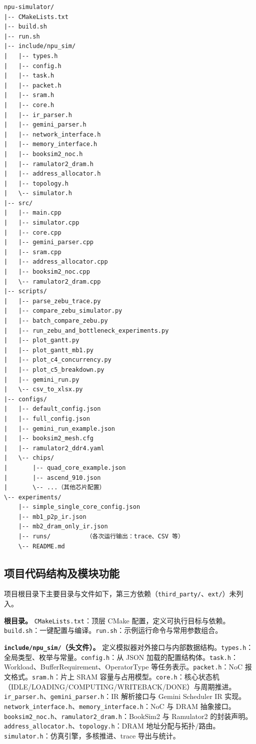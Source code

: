 {\small
\begin{verbatim}
npu-simulator/
|-- CMakeLists.txt
|-- build.sh
|-- run.sh
|-- include/npu_sim/
|   |-- types.h
|   |-- config.h
|   |-- task.h
|   |-- packet.h
|   |-- sram.h
|   |-- core.h
|   |-- ir_parser.h
|   |-- gemini_parser.h
|   |-- network_interface.h
|   |-- memory_interface.h
|   |-- booksim2_noc.h
|   |-- ramulator2_dram.h
|   |-- address_allocator.h
|   |-- topology.h
|   \-- simulator.h
|-- src/
|   |-- main.cpp
|   |-- simulator.cpp
|   |-- core.cpp
|   |-- gemini_parser.cpp
|   |-- sram.cpp
|   |-- address_allocator.cpp
|   |-- booksim2_noc.cpp
|   \-- ramulator2_dram.cpp
|-- scripts/
|   |-- parse_zebu_trace.py
|   |-- compare_zebu_simulator.py
|   |-- batch_compare_zebu.py
|   |-- run_zebu_and_bottleneck_experiments.py
|   |-- plot_gantt.py
|   |-- plot_gantt_mb1.py
|   |-- plot_c4_concurrency.py
|   |-- plot_c5_breakdown.py
|   |-- gemini_run.py
|   \-- csv_to_xlsx.py
|-- configs/
|   |-- default_config.json
|   |-- full_config.json
|   |-- gemini_run_example.json
|   |-- booksim2_mesh.cfg
|   |-- ramulator2_ddr4.yaml
|   \-- chips/
|       |-- quad_core_example.json
|       |-- ascend_910.json
|       \-- ...（其他芯片配置）
\-- experiments/
    |-- simple_single_core_config.json
    |-- mb1_p2p_ir.json
    |-- mb2_dram_only_ir.json
    |-- runs/          （各次运行输出：trace、CSV 等）
    \-- README.md
\end{verbatim}
}

\subsection{项目代码结构及模块功能}

项目根目录下主要目录与文件如下，第三方依赖（\texttt{third\_party/}、\texttt{ext/}）未列入。

\textbf{根目录。}
\texttt{CMakeLists.txt}：顶层 CMake 配置，定义可执行目标与依赖。\texttt{build.sh}：一键配置与编译。\texttt{run.sh}：示例运行命令与常用参数组合。

\textbf{\texttt{include/npu\_sim/}（头文件）。}
定义模拟器对外接口与内部数据结构。\texttt{types.h}：全局类型、枚举与常量。\texttt{config.h}：从 JSON 加载的配置结构体。\texttt{task.h}：Workload、BufferRequirement、OperatorType 等任务表示。\texttt{packet.h}：NoC 报文格式。\texttt{sram.h}：片上 SRAM 容量与占用模型。\texttt{core.h}：核心状态机（IDLE/LOADING/COMPUTING/WRITEBACK/DONE）与周期推进。\texttt{ir\_parser.h}、\texttt{gemini\_parser.h}：IR 解析接口与 Gemini Scheduler IR 实现。\texttt{network\_interface.h}、\texttt{memory\_interface.h}：NoC 与 DRAM 抽象接口。\texttt{booksim2\_noc.h}、\texttt{ramulator2\_dram.h}：BookSim2 与 Ramulator2 的封装声明。\texttt{address\_allocator.h}、\texttt{topology.h}：DRAM 地址分配与拓扑/路由。\texttt{simulator.h}：仿真引擎，多核推进、trace 导出与统计。

